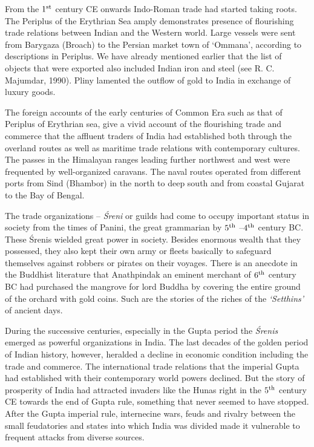 From the $1^{\rm st}$ century CE onwards Indo-Roman trade had started taking roots. The Periplus of the Erythrian Sea amply demonstrates presence of flourishing trade relations between Indian and the Western world. Large vessels were sent from Barygaza (Broach) to the Persian market town of `Ommana', according to descriptions in Periplus. We have already mentioned earlier that the list of objects that were exported also included Indian iron and steel (see R. C. Majumdar, 1990). Pliny lamented the outflow of gold to India in exchange of luxury goods.

The foreign accounts of the early centuries of Common Era such as that of Periplus of Erythrian sea, give a vivid account of the flourishing trade and commerce that the affluent traders of India had established both through the overland routes as well as maritime trade relations with contemporary cultures. The passes in the Himalayan ranges leading further northwest and west were frequented by well-organized caravans. The naval routes operated from different ports from Sind (Bhambor) in the north to deep south and from coastal Gujarat to the Bay of Bengal.

The trade organizations – {\it Śreni} or guilds had come to occupy important status in society from the times of Panini, the great grammarian by $5^{\rm th}$ –$4^{\rm th}$ century BC. These Śrenis wielded great power in society. Besides enormous wealth that they possessed, they also kept their own army or fleets basically to safeguard themselves against robbers or pirates on their voyages. There is an anecdote in the Buddhist literature that Anathpindak an eminent merchant of $6^{\rm th}$ century BC had purchased the mangrove for lord Buddha by covering the entire ground of the orchard with gold coins. Such are the stories of the riches of the {\it `Setthins'} of ancient days.

During the successive centuries, especially in the Gupta period the {\it Śrenis} emerged as powerful organizations in India. The last decades of the golden period of Indian history, however, heralded a decline in economic condition including the trade and commerce. The international trade relations that the imperial Gupta had established with their contemporary world powers declined. But the story of prosperity of India had attracted invaders like the Hunas right in the $5^{\rm th}$ century CE towards the end of Gupta rule, something that never seemed to have stopped. After the Gupta imperial rule, internecine wars, feuds and rivalry between the small feudatories and states into which India was divided made it vulnerable to frequent attacks from diverse sources. 

